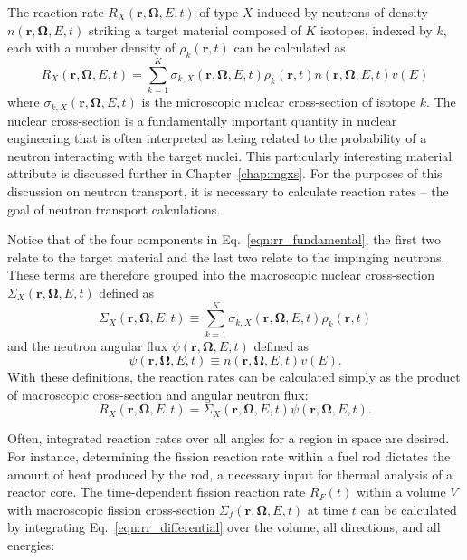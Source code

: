 The reaction rate $R_X(\mathbf{r}, \mathbf{\Omega}, E, t)$ of type $X$ induced by neutrons of density $n(\mathbf{r}, \mathbf{\Omega}, E, t)$ striking a target material composed of $K$ isotopes, indexed by $k$, each with a number density of $\rho_k(\mathbf{r}, t)$ can be calculated as
\begin{equation}
R_X(\mathbf{r}, \mathbf{\Omega}, E, t) = \sum_{k=1}^K \sigma_{k,X}(\mathbf{r}, \mathbf{\Omega}, E, t) \rho_k(\mathbf{r}, t) n(\mathbf{r}, \mathbf{\Omega}, E, t) v(E) 
\label{eqn:rr_fundamental}
\end{equation}
where $\sigma_{k,X}(\mathbf{r}, \mathbf{\Omega}, E, t)$ is the microscopic nuclear cross-section of isotope $k$\cite{duderstadt}. The nuclear cross-section is a fundamentally important quantity in nuclear engineering that is often interpreted as being related to the probability of a neutron interacting with the target nuclei. This particularly interesting material attribute is discussed further in Chapter~\ref{chap:mgxs}. For the purposes of this discussion on neutron transport, it is necessary to calculate reaction rates -- the goal of neutron transport calculations.

Notice that of the four components in Eq.~\ref{eqn:rr_fundamental}, the first two relate to the target material and the last two relate to the impinging neutrons. These terms are therefore grouped into the macroscopic nuclear cross-section $\Sigma_X(\mathbf{r}, \mathbf{\Omega}, E, t)$ defined as
\begin{equation}
\Sigma_X(\mathbf{r}, \mathbf{\Omega}, E, t) \equiv \sum_{k=1}^K \sigma_{k,X}(\mathbf{r}, \mathbf{\Omega}, E, t) \rho_k(\mathbf{r}, t)
\end{equation} 
and the neutron angular flux $\psi(\mathbf{r}, \mathbf{\Omega}, E, t)$ defined as
\begin{equation}
\psi(\mathbf{r}, \mathbf{\Omega}, E, t) \equiv n(\mathbf{r}, \mathbf{\Omega}, E, t) v(E).
\label{eqn:angular_neutron_flux}
\end{equation}
With these definitions, the reaction rates can be calculated simply as the product of macroscopic cross-section and angular neutron flux:
\begin{equation}
R_X(\mathbf{r}, \mathbf{\Omega}, E, t) = \Sigma_X(\mathbf{r}, \mathbf{\Omega}, E, t) \psi(\mathbf{r}, \mathbf{\Omega}, E, t).
\label{eqn:rr_differential}
\end{equation}

Often, integrated reaction rates over all angles for a region in space are desired. For instance, determining the fission reaction rate within a fuel rod dictates the amount of heat produced by the rod, a necessary input for thermal analysis of a reactor core. The time-dependent fission reaction rate $R_F(t)$ within a volume $V$ with macroscopic fission cross-section $\Sigma_f(\mathbf{r}, \mathbf{\Omega}, E, t)$ at time $t$ can be calculated by integrating Eq.~\ref{eqn:rr_differential} over the volume, all directions, and all energies:

